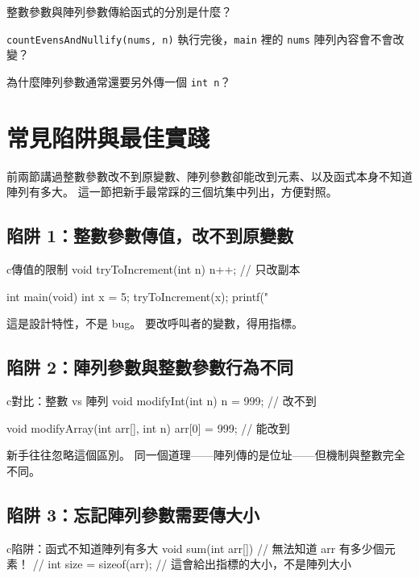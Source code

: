 \begin{drills}[label=drills:func-passing]
\item 整數參數與陣列參數傳給函式的分別是什麼？
\item \texttt{countEvensAndNullify(nums, n)} 執行完後，\texttt{main}
裡的 \texttt{nums} 陣列內容會不會改變？
\item 為什麼陣列參數通常還要另外傳一個 \texttt{int n}？
\end{drills}

\section{常見陷阱與最佳實踐}
\label{sec:func-pitfalls}

前兩節講過整數參數改不到原變數、陣列參數卻能改到元素、以及函式本身不知道
陣列有多大。 這一節把新手最常踩的三個坑集中列出，方便對照。

\subsection{陷阱 1：整數參數傳值，改不到原變數}

\begin{code}{c}{傳值的限制}
void tryToIncrement(int n) {
    n++;  // 只改副本
}

int main(void) {
    int x = 5;
    tryToIncrement(x);
    printf("%
}
\end{code}

這是設計特性，不是 bug。 要改呼叫者的變數，得用指標。

\subsection{陷阱 2：陣列參數與整數參數行為不同}

\begin{code}{c}{對比：整數 vs 陣列}
void modifyInt(int n) {
    n = 999;  // 改不到
}

void modifyArray(int arr[], int n) {
    arr[0] = 999;  // 能改到
}
\end{code}

新手往往忽略這個區別。 同一個道理——陣列傳的是位址——但機制與整數完全不同。

\subsection{陷阱 3：忘記陣列參數需要傳大小}

\begin{code}{c}{陷阱：函式不知道陣列有多大}
void sum(int arr[]) {
    // 無法知道 arr 有多少個元素！
    // int size = sizeof(arr);  // 這會給出指標的大小，不是陣列大小
}
\end{code}

